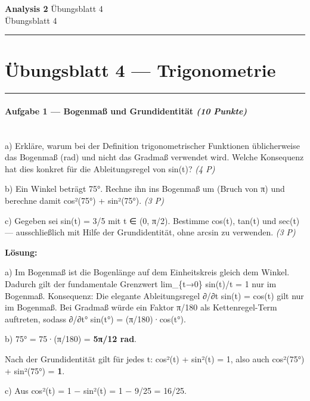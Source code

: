 \documentclass[11pt, a4paper]{article}
\providecommand{\nichttitle}{Übungsblatt}
\providecommand{\nichtsubtitle}{}
\renewcommand{\nichttitle}{Analysis 2}
\renewcommand{\nichtsubtitle}{Übungsblatt 4}
\begin{document}
\begin{center}
{\Large\bfseries\color{accent}\nichttitle}
\ifx\nichtsubtitle\empty\else
  \\[2pt]{\normalsize\color{accent!80!black}\nichtsubtitle}
\fi
\\[2pt]
\color{accent}\rule{0.4\linewidth}{0.8pt}\color{black}
\end{center}
\vspace{4pt}


\section{Übungsblatt 4 — Trigonometrie}


\noindent\textcolor{rulegray}{\rule{\linewidth}{0.4pt}}


\paragraph{Aufgabe 1 — Bogenmaß und Grundidentität \textit{(10 Punkte)}}\mbox{}\\[2pt]

a) Erkläre, warum bei der Definition trigonometrischer Funktionen üblicherweise das Bogenmaß (rad) und nicht das Gradmaß verwendet wird. Welche Konsequenz hat dies konkret für die Ableitungsregel von sin(t)? \textit{(4 P)}


b) Ein Winkel beträgt 75°. Rechne ihn ins Bogenmaß um (Bruch von π) und berechne damit cos²(75°) + sin²(75°). \textit{(3 P)}


c) Gegeben sei sin(t) = 3/5 mit t ∈ (0, π/2). Bestimme cos(t), tan(t) und sec(t) — ausschließlich mit Hilfe der Grundidentität, ohne arcsin zu verwenden. \textit{(3 P)}


\textbf{Lösung:}


a) Im Bogenmaß ist die Bogenlänge auf dem Einheitskreis gleich dem Winkel. Dadurch gilt der fundamentale Grenzwert lim\_\{t→0\} sin(t)/t = 1 nur im Bogenmaß. Konsequenz: Die elegante Ableitungsregel ∂/∂t sin(t) = cos(t) gilt nur im Bogenmaß. Bei Gradmaß würde ein Faktor π/180 als Kettenregel-Term auftreten, sodass ∂/∂t° sin(t°) = (π/180)·cos(t°).


b) 75° = 75·(π/180) = \textbf{5π/12 rad}.

Nach der Grundidentität gilt für jedes t: cos²(t) + sin²(t) = 1, also auch cos²(75°) + sin²(75°) = \textbf{1}.


c) Aus cos²(t) = 1 − sin²(t) = 1 − 9/25 = 16/25.
\end{document}
